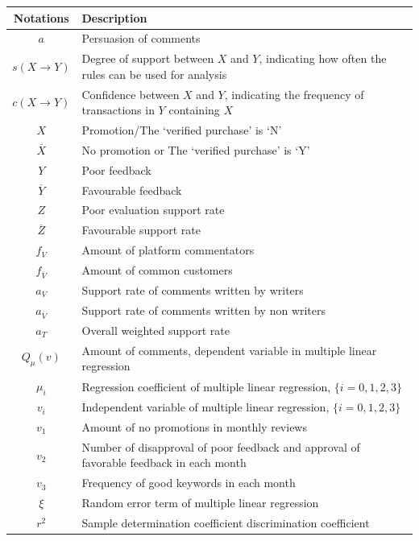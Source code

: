 \documentclass[12pt,a4paper]{article}
\begin{document}
\begin{spacing}{1.2}
\begin{table}[h]
\renewcommand{\arraystretch}{1.2}
\begin{center}
{\footnotesize
\begin{tabular}{c l}
\toprule
{Notations} & {Description} \\
\midrule
$a$    & {Persuasion of comments} \\
$s(X\rightarrow Y)$  &  {Degree of support between $X$ and $Y$,  indicating how often the rules can be used for analysis}\\
$c(X\rightarrow Y)$  &  {Confidence between $X$ and $Y$, indicating the frequency of transactions in $Y$ containing $X$} \\
$X$ & {Promotion/The `verified purchase' is `N'} \\
$\overline{X}$ & {No promotion or The `verified purchase' is `Y'} \\
$Y$ & {Poor feedback} \\
$\overline{Y}$ & {Favourable feedback} \\
$Z$ & {Poor evaluation support rate} \\
$\overline{Z}$ & {Favourable support rate} \\
$f_{V}$ & {Amount of platform commentators} \\
$f_{\overline{V}}$ & {Amount of common customers} \\
$a_{V}$ & {Support rate of comments written by writers} \\
$a_{\overline{V}}$ & {Support rate of comments written by non writers} \\
$a_{T}$ & {Overall weighted support rate} \\
$Q_\mu(v)$ & {Amount of comments, dependent variable in multiple linear regression} \\
$\mu_i$ & {Regression coefficient of multiple linear regression, $\lbrace i=0, 1, 2, 3 \rbrace$} \\
$v_i$ & {Independent variable of multiple linear regression, $\lbrace i=0, 1, 2, 3 \rbrace$} \\
$v_1$ & {Amount of no promotions in monthly reviews} \\
$v_2$ & {Number of disapproval of poor feedback and approval of favorable feedback in each month} \\
$v_3$ & {Frequency of good keywords in each month} \\
$\xi$ & {Random error term of multiple linear regression} \\
$r^2$ & {Sample determination coefficient discrimination coefficient} \\

\end{tabular}}
\end{center}
\end{table}
\end{spacing}
\end{document}
